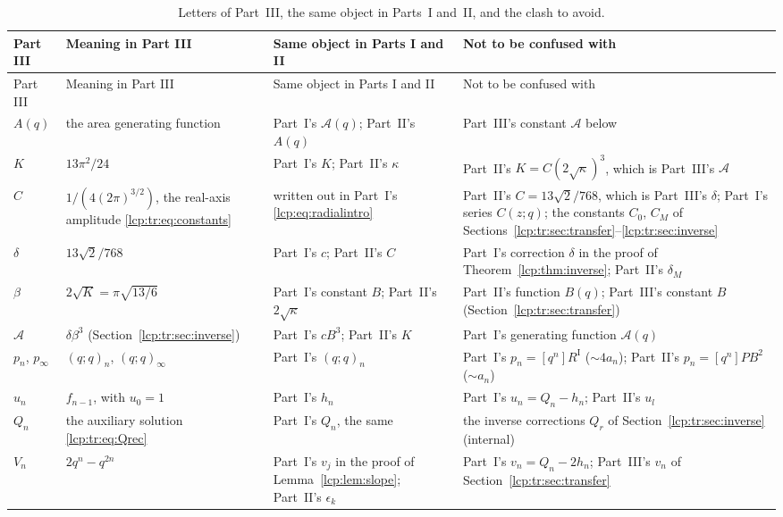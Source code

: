 \documentclass[11pt]{article}
\numberwithin{equation}{section}
\theoremstyle{definition}\newtheorem{definition}[theorem]{Definition}
\theoremstyle{remark}\newtheorem{remark}[theorem]{Remark}
\newcommand{\Acal}{\mathcal A}
\begin{document}
{\small
\begin{longtable}{@{}>{\raggedright}p{}>{\raggedright}p{}>{\raggedright}p{}>{\raggedright\arraybackslash}p{}@{}}
\caption{Letters of Part~III, the same object in Parts~I and~II, and the clash to avoid.}\label{lcp:tr:tab:notation}\\
\toprule
Part III & Meaning in Part III & Same object in Parts I and II & Not to be confused with\\
\midrule
\endfirsthead
\toprule
Part III & Meaning in Part III & Same object in Parts I and II & Not to be confused with\\
\midrule
\endhead
\bottomrule
\endfoot
$A(q)$ & the area generating function & Part~I's $\Acal(q)$; Part~II's $A(q)$ & Part~III's constant $\mathcal A$ below\\
$K$ & $13\pi^2/24$ & Part~I's $K$; Part~II's $\kappa$ & Part~II's $K=C(2\sqrt\kappa)^3$, which is Part~III's $\mathcal A$\\
$C$ & $1/(4(2\pi)^{3/2})$, the real-axis amplitude \eqref{lcp:tr:eq:constants} & written out in Part~I's \eqref{lcp:eq:radialintro} & Part~II's $C=13\sqrt2/768$, which is Part~III's $\delta$; Part~I's series $C(z;q)$; the constants $C_0$, $C_M$ of Sections~\ref{lcp:tr:sec:transfer}--\ref{lcp:tr:sec:inverse}\\
$\delta$ & $13\sqrt2/768$ & Part~I's $c$; Part~II's $C$ & Part~I's correction $\delta$ in the proof of Theorem~\ref{lcp:thm:inverse}; Part~II's $\delta_M$\\
$\beta$ & $2\sqrt K=\pi\sqrt{13/6}$ & Part~I's constant $B$; Part~II's $2\sqrt\kappa$ & Part~II's function $B(q)$; Part~III's constant $B$ (Section~\ref{lcp:tr:sec:transfer})\\
$\mathcal A$ & $\delta\beta^3$ (Section~\ref{lcp:tr:sec:inverse}) & Part~I's $cB^3$; Part~II's $K$ & Part~I's generating function $\Acal(q)$\\
$p_n$, $p_\infty$ & $(q;q)_n$, $(q;q)_\infty$ & Part~I's $(q;q)_n$ & Part~I's $p_n=[q^n]R^{\mathrm I}$ ($\sim4a_n$); Part~II's $p_n=[q^n]PB^2$ ($\sim a_n$)\\
$u_n$ & $f_{n-1}$, with $u_0=1$ & Part~I's $h_n$ & Part~I's $u_n=Q_n-h_n$; Part~II's $u_l$\\
$Q_n$ & the auxiliary solution \eqref{lcp:tr:eq:Qrec} & Part~I's $Q_n$, the same & the inverse corrections $Q_r$ of Section~\ref{lcp:tr:sec:inverse} (internal)\\
$V_n$ & $2q^n-q^{2n}$ & Part~I's $v_j$ in the proof of Lemma~\ref{lcp:lem:slope}; Part~II's $\epsilon_k$ & Part~I's $v_n=Q_n-2h_n$; Part~III's $v_n$ of Section~\ref{lcp:tr:sec:transfer}\\

\end{longtable}}
\end{document}
